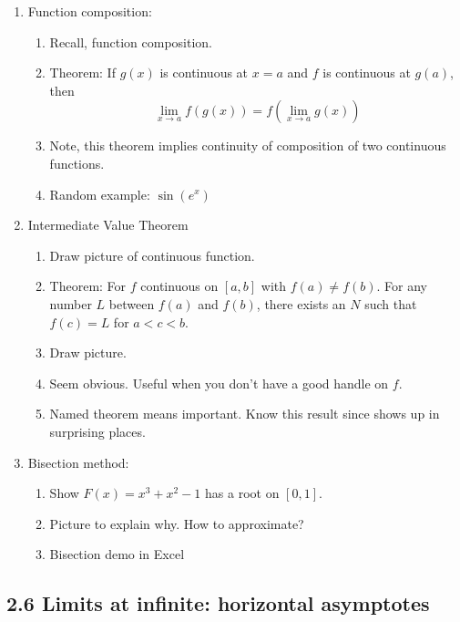 \documentclass{article}
\begin{document}
\begin{enumerate}
\item Function composition: 
\begin{enumerate}
\item Recall, function composition.
\item Theorem: If $g(x)$ is continuous at $x=a$ and $f$ is continuous at $g(a)$, then
$$
\lim_{x\rightarrow a} f(g(x)) = f(\lim_{x\rightarrow a} g(x) ) 
$$
\item Note, this theorem implies continuity of composition of two continuous functions.
\item Random example: $\sin(e^x)$
\end{enumerate}

\item Intermediate Value Theorem 
\begin{enumerate}
\item Draw picture of continuous function.
\item Theorem: For $f$ continuous on $[a,b]$ with $f(a) \neq f(b)$. 
For any number $L$ between $f(a)$ and $f(b)$, there exists an $N$ such that $f(c)=L$ for $a<c<b.$
\item Draw picture.
\item Seem obvious. Useful when you don't have a good handle on $f$.
\item Named theorem means important. Know this result since shows up in surprising places.
\end{enumerate}

\item Bisection method:
\begin{enumerate}
\item Show $F(x) = x^3+x^2-1$ has a root on $[0,1]$. 
\item Picture to explain why. How to approximate?
\item Bisection demo in Excel
\end{enumerate}

\end{enumerate}


\subsection{2.6 Limits at infinite: horizontal asymptotes}
\end{document}
